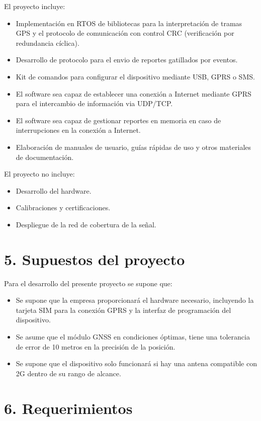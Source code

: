 \documentclass[
11pt, %
codirector, %
]{charter}
\begin{document}
El proyecto incluye:
\begin{itemize}

    \item Implementación en RTOS de bibliotecas para la interpretación de tramas GPS y el protocolo de comunicación con control CRC (verificación por redundancia cíclica).
    \item Desarrollo de protocolo para el envio de reportes gatillados por eventos.
    \item Kit de comandos para configurar el dispositivo mediante USB, GPRS o SMS.
    \item El software sea capaz de establecer una conexión a Internet mediante GPRS para el intercambio de información via UDP/TCP.
    \item El software sea capaz de gestionar reportes en memoria en caso de interrupciones en la conexión a Internet.
    \item Elaboración de manuales de usuario, guías rápidas de uso y otros materiales de documentación.

\end{itemize}
El proyecto no incluye:
\begin{itemize}
    \item Desarrollo del hardware.
    \item Calibraciones y certificaciones.
    \item Despliegue de la red de cobertura de la señal.
\end{itemize}
\pagebreak

\section{5. Supuestos del proyecto}
\label{sec:supuestos}
Para el desarrollo del presente proyecto se supone que:
\begin{itemize}
\item Se supone que la empresa proporcionará el hardware necesario, incluyendo la tarjeta SIM para la conexión GPRS y la interfaz de programación del dispositivo.
\item Se asume que el módulo GNSS en condiciones óptimas, tiene una tolerancia de error de 10 metros en la precisión de la posición.
\item Se supone que el dispositivo solo funcionará si hay una antena compatible con 2G dentro de su rango de alcance.
\end{itemize}

\section{6. Requerimientos}
\label{sec:requerimientos}
\end{document}
